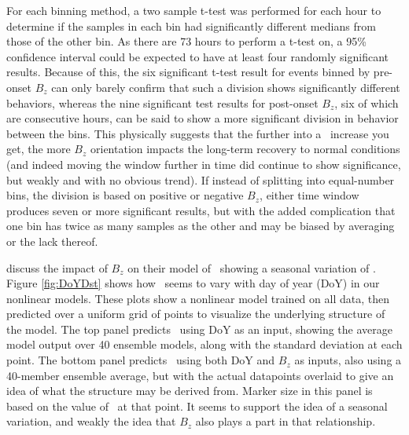 For each binning method, a two sample t-test was performed for each hour to determine if the samples in each bin had significantly different medians from those of the other bin. As there are 73 hours to perform a t-test on, a 95\% confidence interval could be expected to have at least four randomly significant results. Because of this, the six significant t-test result for events binned by pre-onset $B_z$ can only barely confirm that such a division shows significantly different behaviors, whereas the nine significant test results for post-onset $B_z$, six of which are consecutive hours, can be said to show a more significant division in behavior between the bins. This physically suggests that the further into a \req\ increase you get, the more $B_z$ orientation impacts the long-term recovery to normal conditions (and indeed moving the window further in time did continue to show significance, but weakly and with no obvious trend). If instead of splitting into equal-number bins, the division is based on positive or negative $B_z$, either time window produces seven or more significant results, but with the added complication that one bin has twice as many samples as the other and may be biased by averaging or the lack thereof. 

\cite{Temerin2002NewModelPredictionDst} discuss the impact of $B_z$ on their model of \dst\ showing a seasonal variation of \dst. Figure \ref{fig:DoYDst} shows how \dst\ seems to vary with day of year (DoY) in our nonlinear models. These plots show a nonlinear model trained on all data, then predicted over a uniform grid of points to visualize the underlying structure of the model. The top panel predicts \dst\ using DoY as an input, showing the average model output over 40 ensemble models, along with the standard deviation at each point. The bottom panel predicts \dst\ using both DoY and $B_z$ as inputs, also using a 40-member ensemble average, but with the actual datapoints overlaid to give an idea of what the structure may be derived from. Marker size in this panel is based on the value of \dst\ at that point. It seems to support the idea of a seasonal variation, and weakly the idea that $B_z$ also plays a part in that relationship.


